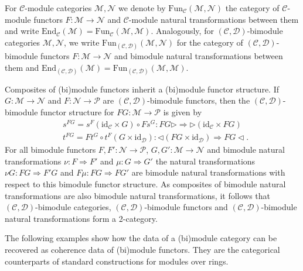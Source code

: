 \documentclass[1.5pt, a4paper]{article}
\newcommand{\mac}{\mathcal C}
\newcommand{\mad}{\mathcal D}
\newcommand{\mam}{\mathcal M}
\newcommand{\man}{\mathcal N}
\newcommand{\map}{\mathcal P}
\newcommand{\End}{\mathrm{End}}
\newcommand{\Fun}{\mathrm{Fun}}
\newcommand{\id}[0]{\mathrm{id}}
\begin{document}
For $\mac$-module categories $\mam,\man$ we denote by $\Fun_\mac(\mam,\man)$ the category of $\mac$-module functors $F:\mam\to\man$ and $\mac$-module natural transformations between them and write $\End_\mac(\mam)=\Fun_\mac(\mam,\mam)$. Analogously, for $(\mac,\mad)$-bimodule categories $\mam,\man$, we write
$\Fun_{(\mac,\mad)}(\mam,\man)$ for the category of $(\mac,\mad)$-bimodule functors $F:\mam\to\man$ and bimodule natural transformations between them and $\End_{(\mac,\mad)}(\mam)=\Fun_{(\mac,\mad)}(\mam,\mam)$.

Composites of (bi)module functors inherit a  (bi)module functor  structure.  If $G:\mam\to\man$ and $F:\man\to\map$ are $(\mac,\mad)$-bimodule functors, then the  $(\mac,\mad)$-bimodule functor structure for $FG:\mam\to\map$ is given by 
\begin{align}\label{eq:bimodcomp}
&s^{FG}=s^F (\id_\mac\times G)\circ Fs^G: FG\rhd \Rightarrow \rhd(\id_\mac\times FG)\\
& t^{FG}=Ft^G\circ t^F (G\times\id_\mad): \lhd(FG\times\id_\mad)\Rightarrow FG\lhd.\nonumber
\end{align}
For all  bimodule functors  $F,F':\man\to\map$, $G,G':\mam\to\man$   and bimodule natural transformations $\nu: F\Rightarrow F'$ and $\mu: G\Rightarrow G'$  the natural transformations $\nu G: FG\Rightarrow F'G$ and $F\mu: FG\Rightarrow FG'$ are bimodule natural transformations with respect to this bimodule functor structure. As composites of bimodule natural transformations are  also bimodule natural transformations, it follows that  $(\mac,\mad)$-bimodule categories, $(\mac,\mad)$-bimodule functors and $(\mac,\mad)$-bimodule natural transformations form a 2-category. 




The following examples show how the data of a (bi)module category can be recovered as coherence data of  (bi)module functors.
They are the categorical counterparts of standard constructions for modules over rings.
\end{document}
